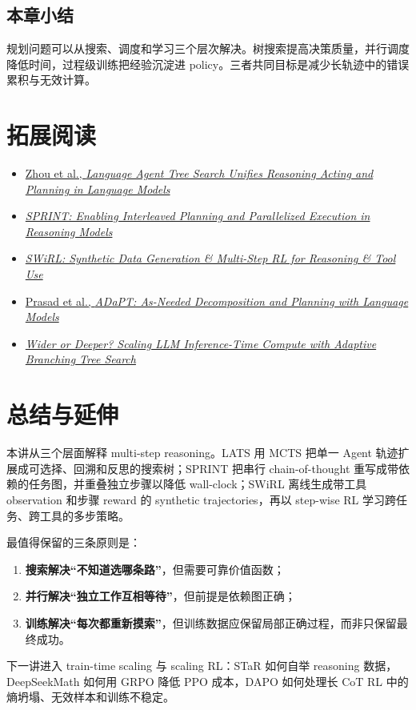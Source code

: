 \documentclass[a4paper]{article}
\begin{document}
\subsection{本章小结}

规划问题可以从搜索、调度和学习三个层次解决。树搜索提高决策质量，并行调度降低时间，过程级训练把经验沉淀进 policy。三者共同目标是减少长轨迹中的错误累积与无效计算。

\section{拓展阅读}

\begin{itemize}
    \item \href{https://arxiv.org/abs/2310.04406}{Zhou et al., \emph{Language Agent Tree Search Unifies Reasoning Acting and Planning in Language Models}}
    \item \href{https://arxiv.org/abs/2506.05745}{\emph{SPRINT: Enabling Interleaved Planning and Parallelized Execution in Reasoning Models}}
    \item \href{https://arxiv.org/abs/2504.04736}{\emph{SWiRL: Synthetic Data Generation \& Multi-Step RL for Reasoning \& Tool Use}}
    \item \href{https://arxiv.org/abs/2311.05772}{Prasad et al., \emph{ADaPT: As-Needed Decomposition and Planning with Language Models}}
    \item \href{https://arxiv.org/abs/2503.04412}{\emph{Wider or Deeper? Scaling LLM Inference-Time Compute with Adaptive Branching Tree Search}}
\end{itemize}

\section{总结与延伸}

本讲从三个层面解释 multi-step reasoning。LATS 用 MCTS 把单一 Agent 轨迹扩展成可选择、回溯和反思的搜索树；SPRINT 把串行 chain-of-thought 重写成带依赖的任务图，并重叠独立步骤以降低 wall-clock；SWiRL 离线生成带工具 observation 和步骤 reward 的 synthetic trajectories，再以 step-wise RL 学习跨任务、跨工具的多步策略。

最值得保留的三条原则是：

\begin{enumerate}
    \item \textbf{搜索解决“不知道选哪条路”}，但需要可靠价值函数；
    \item \textbf{并行解决“独立工作互相等待”}，但前提是依赖图正确；
    \item \textbf{训练解决“每次都重新摸索”}，但训练数据应保留局部正确过程，而非只保留最终成功。
\end{enumerate}

下一讲进入 train-time scaling 与 scaling RL：STaR 如何自举 reasoning 数据，DeepSeekMath 如何用 GRPO 降低 PPO 成本，DAPO 如何处理长 CoT RL 中的熵坍塌、无效样本和训练不稳定。
\end{document}
